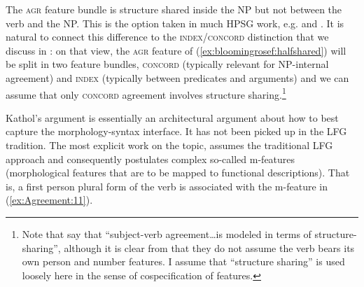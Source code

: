 \documentclass[output=paper,hidelinks]{langscibook}
\begin{document}
 The \textsc{agr} feature bundle is structure shared inside the NP
but not between the verb and the NP. This is the option taken in much
HPSG work, e.g. \citet{pollard1994head-driven} and
\citet{WechslerZlatic:Agreement2003}. It is natural to connect this
difference to the \textsc{index/concord} distinction that we discuss
in : on that view, the \textsc{agr}
feature of (\ref{ex:bloomingrosef:halfshared}) will be split in two feature bundles,
\textsc{concord} (typically relevant for NP-internal agreement) and
\textsc{index} (typically between predicates and arguments) and we can
assume that only \textsc{concord} agreement involves structure
sharing.\footnote{Note that \citet[145]{WechslerZlatic:Agreement2003}
say that ``subject-verb agreement\dots is modeled in terms of
structure-sharing'', although it is clear from
\citet[21]{WechslerZlatic:Agreement2003} that they do not assume the
verb bears its own person and number features. I assume that
``structure sharing'' is used loosely here in the sense of cospecification of
features.}

Kathol's argument is essentially an architectural argument about how
to best capture the morphology-syntax interface. It has not been
picked up in the LFG tradition. The most explicit work on the topic,
\textcite[Chapter 12]{DLM:LFG} assumes the traditional
LFG approach and consequently postulates complex so-called m-features
(morphological features that are to be mapped to functional
descriptions). That is, a first person plural form of the verb is
associated with the m-feature in (\ref{ex:Agreement:11}).
\end{document}
